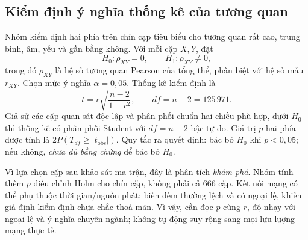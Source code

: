 \documentclass[../main.tex]{subfiles}
\begin{document}
\subsection{Kiểm định ý nghĩa thống kê của tương quan}
\label{sec:t31:kiem-dinh}
Nhóm kiểm định hai phía trên chín cặp tiêu biểu cho tương quan rất cao,
trung bình, âm, yếu và gần bằng không. Với mỗi cặp $X,Y$, đặt
\begin{equation}
 H_0:\rho_{XY}=0,\qquad H_1:\rho_{XY}\neq 0,
 \label{eq:t31:hypotheses}
\end{equation}
trong đó $\rho_{XY}$ là hệ số tương quan Pearson của tổng thể, phân biệt
với hệ số mẫu $r_{XY}$. Chọn mức ý nghĩa $\alpha=0{,}05$. Thống kê kiểm định là
\begin{equation}
 t= r\sqrt{\frac{n-2}{1-r^2}}, \qquad df=n-2=125\,971.
 \label{eq:t31:t-stat}
\end{equation}
Giả sử các cặp quan sát độc lập và phân phối chuẩn hai chiều phù hợp,
dưới $H_0$ thì thống kê có phân phối Student với $df=n-2$ bậc tự do.
Giá trị $p$ hai phía được tính là $2P(T_{df}\geq|t_{\mathrm{obs}}|)$.
Quy tắc ra quyết định: bác bỏ $H_0$ khi $p<0{,}05$; nếu không,
\emph{chưa đủ bằng chứng} để bác bỏ $H_0$.

Vì lựa chọn cặp sau khảo sát ma trận, đây là phân tích \emph{khám phá}.
Nhóm tính thêm $p$ điều chỉnh Holm cho chín cặp, không phải cả 666 cặp.
Kết nối mạng có thể phụ thuộc thời gian/nguồn phát; biến đếm thường lệch và
có ngoại lệ, khiến giả định kiểm định chưa chắc thoả mãn. Vì vậy, cần đọc
$p$ cùng $r$, độ nhạy với ngoại lệ và ý nghĩa chuyên ngành; không tự động
suy rộng sang mọi lưu lượng mạng thực tế.
\end{document}
